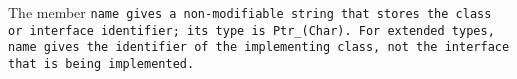 The member \tt{name} gives a non-modifiable string that stores
the class or interface identifier; its type is \tt{Ptr_(Char)}.
For extended types, \tt{name} gives the identifier of the
implementing class, not the interface that is being implemented.
